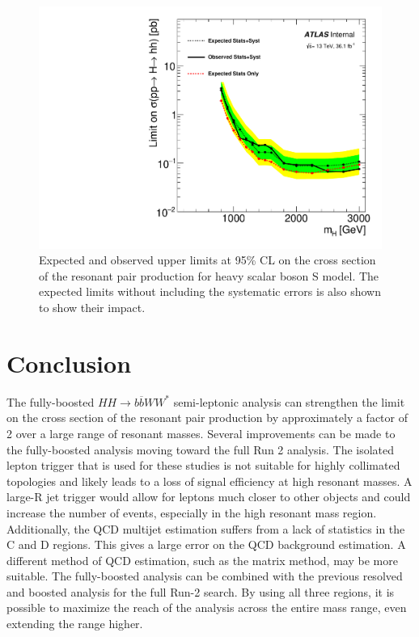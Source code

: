 \begin{figure}[h]
\begin{center}
\includegraphics[scale=0.65]{figures/Final_limits}
\caption[Expected and observed upper limits at 95\% CL on the cross section of the resonant pair production for heavy scalar boson S model]{Expected and observed upper limits at 95\% CL on the cross section of the resonant pair production for heavy scalar boson S model. The expected limits without including the systematic errors is also shown to show their impact.}
\label{fig:boosted_only_limits_new}
\end{center}
\end{figure}
\newpage

\section{Conclusion}
The fully-boosted ${HH\rightarrow b\overline{b}WW^{*}}$ semi-leptonic analysis can strengthen the limit on the cross section of the resonant pair production by approximately a factor of 2 over a large range of resonant masses. \newline
\indent Several improvements can be made to the fully-boosted analysis moving toward the full Run 2 analysis. The isolated lepton trigger that is used for these studies is not suitable for highly collimated topologies and likely leads to a loss of signal efficiency at high resonant masses. A large-R jet trigger would allow for leptons much closer to other objects and could increase the number of events, especially in the high resonant mass region. Additionally, the QCD multijet estimation suffers from a lack of statistics in the C and D regions. This gives a large error on the QCD background estimation. A different method of QCD estimation, such as the matrix method, may be more suitable.\newline
\indent The fully-boosted analysis can be combined with the previous resolved and boosted analysis for the full Run-2 search. By using all three regions, it is possible to maximize the reach of the analysis across the entire mass range, even extending the range higher. 

